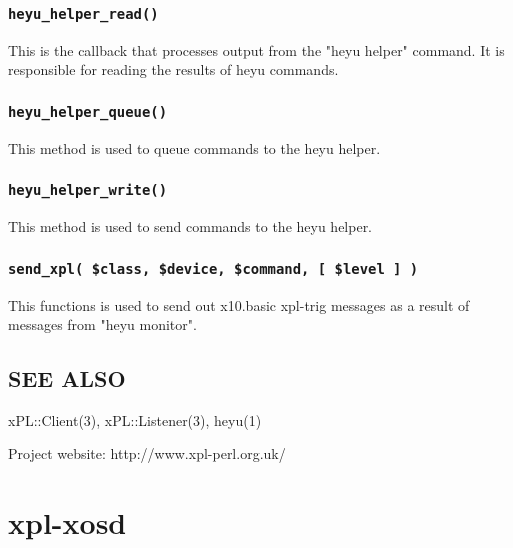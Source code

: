 \documentclass[12pt,a4paper]{article}
\begin{document}
\subsubsection*{\texttt{heyu\_helper\_read()}\label{xpl-x10_heyu_helper_read_}}


This is the callback that processes output from the "heyu helper"
command.  It is responsible for reading the results of heyu commands.

\subsubsection*{\texttt{heyu\_helper\_queue()}\label{xpl-x10_heyu_helper_queue_}}


This method is used to queue commands to the heyu helper.

\subsubsection*{\texttt{heyu\_helper\_write()}\label{xpl-x10_heyu_helper_write_}}


This method is used to send commands to the heyu helper.

\subsubsection*{\texttt{send\_xpl( \$class, \$device, \$command, [ \$level ] )}\label{xpl-x10_send_xpl_class_device_command_level_}}


This functions is used to send out x10.basic xpl-trig messages as a
result of messages from "heyu monitor".

\subsection*{SEE ALSO\label{xpl-x10_SEE_ALSO}}


xPL::Client(3), xPL::Listener(3), heyu(1)



Project website: http://www.xpl-perl.org.uk/

\newpage
\section{xpl-xosd\label{xpl-xosd}}
\end{document}
